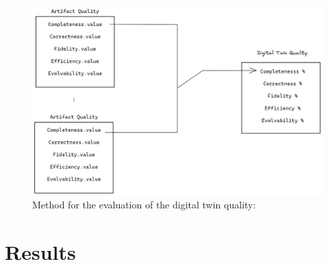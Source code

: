 \documentclass{llncs}
\begin{document}
    \begin{figure}[htbp]
        \includegraphics[scale = 0.25]{DigitalTwinQuality.png}
            \caption{Method for the evaluation of the digital twin quality:}
        \label{fig:MethodforDigitalTwinQuality}
    \end{figure}
   
    
    \section{Results}
\end{document}

